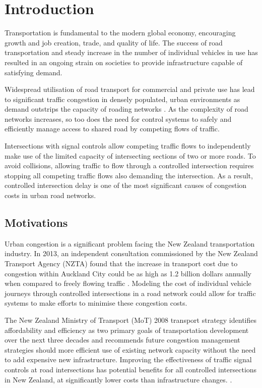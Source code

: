 \chapter{Introduction}

Transportation is fundamental to the modern global economy, encouraging growth and job creation, trade, and quality of life. The success of road transportation and steady increase in the number of individual vehicles in use has resulted in an ongoing strain on societies to provide infrastructure capable of satisfying demand. 

Widespread utilisation of road transport for commercial and private use has lead to significant traffic congestion in densely populated, urban environments as demand outstrips the capacity of roading networks \cite{euro2011whitepaper,papa2003review}. As the complexity of road networks increases, so too does the need for control systems to safely and efficiently manage access to shared road by competing flows of traffic. 

Intersections with signal controls allow competing traffic flows to independently make use of the limited capacity of intersecting sections of  two or more roads. To avoid collisions, allowing traffic to flow through a controlled intersection requires stopping all competing traffic flows also demanding the intersection. As a result, controlled intersection delay is one of the most significant causes of congestion costs in urban road networks.

\section {Motivations}

Urban congestion is a significant problem facing the New Zealand transportation industry. In 2013, an independent consultation commissioned by the New Zealand Transport Agency (NZTA) found that the increase in transport cost due to congestion within Auckland City could be as high as 1.2 billion dollars annually when compared to freely flowing traffic \cite{wallis2013costs}. Modeling the cost of individual vehicle journeys through controlled intersections in a road network could allow for traffic systems to make efforts to minimise these congestion costs.

The New Zealand Ministry of Transport (MoT) 2008 transport strategy identifies affordability and efficiency as two primary goals of transportation development over the next three decades and recommends future congestion management strategies should more efficient use of existing network capacity without the need to add expensive new infrastructure. Improving the effectiveness of traffic signal controls at road intersections has potential benefits for all controlled intersections in New Zealand, at significantly lower costs than infrastructure changes. \cite{mot2008strategy}.

